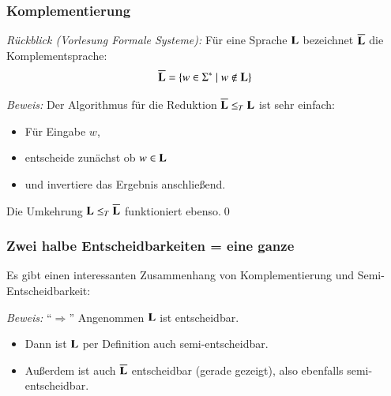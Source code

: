 \documentclass[onlymath]{beamer}
\begin{document}
\begin{frame}\frametitle{Komplementierung}

\emph{Rückblick (Vorlesung Formale Systeme):} Für eine Sprache $\textbf{\textcolor{black}{L}}$ bezeichnet $\overline{\textbf{\textcolor{black}{L}}}$ die \alert{Komplementsprache}:
\[ \overline{\textbf{\textcolor{black}{L}}} = \{w\in\Sigma^*\mid w\notin\textbf{\textcolor{black}{L}} \}\]\pause


\pause
\emph{Beweis:} Der Algorithmus für die Reduktion $\overline{\textbf{\textcolor{black}{L}}}\leq_T\textbf{\textcolor{black}{L}}$ ist sehr einfach:
\begin{itemize}
\item Für Eingabe $w$,
\item entscheide zunächst ob $w\in\textbf{\textcolor{black}{L}}$
\item und invertiere das Ergebnis anschließend.
\end{itemize}
Die Umkehrung $\textbf{\textcolor{black}{L}}\leq_T\overline{\textbf{\textcolor{black}{L}}}$ funktioniert ebenso.\qed
\bigskip\pause


\end{frame}

\begin{frame}[t]\frametitle{Zwei halbe Entscheidbarkeiten = eine ganze}

Es gibt einen interessanten Zusammenhang von Komplementierung und Semi-Entscheidbarkeit:\\[1ex]

\pause

\emph{Beweis:} "`$\Rightarrow$"' Angenommen $\textbf{\textcolor{black}{L}}$ ist entscheidbar.\pause

\begin{itemize}
\item Dann ist $\textbf{\textcolor{black}{L}}$ per Definition auch semi-entscheidbar.
\item Außerdem ist auch $\overline{\textbf{\textcolor{black}{L}}}$ entscheidbar (gerade gezeigt), also ebenfalls semi-entscheidbar.
\end{itemize}

\end{frame}
\end{document}
